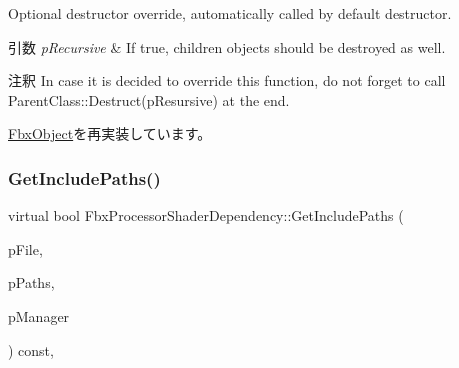 Optional destructor override, automatically called by default destructor. 
\begin{DoxyParams}{引数}
{\em p\+Recursive} & If true, children objects should be destroyed as well. \\
\hline
\end{DoxyParams}
\begin{DoxyRemark}{注釈}
In case it is decided to override this function, do not forget to call Parent\+Class\+::\+Destruct(p\+Resursive) at the end. 
\end{DoxyRemark}


\hyperlink{class_fbx_object_a123e084d9b32b29c28af6384b7c3c608}{Fbx\+Object}を再実装しています。

\mbox{\label{class_fbx_processor_shader_dependency_a41473d93802b3f628bede8dad500d42c}} 
\subsubsection{\texorpdfstring{Get\+Include\+Paths()}{GetIncludePaths()}}
{\footnotesize\ttfamily virtual bool Fbx\+Processor\+Shader\+Dependency\+::\+Get\+Include\+Paths (\begin{DoxyParamCaption}\item[{\hyperlink{class_fbx_string}{Fbx\+String} \&}]{p\+File,  }\item[{\hyperlink{class_fbx_processor_shader_dependency_a52e467804857e767f194d73000b08f39}{File\+Path\+List} \&}]{p\+Paths,  }\item[{\hyperlink{class_fbx_x_ref_manager}{Fbx\+X\+Ref\+Manager} \&}]{p\+Manager }\end{DoxyParamCaption}) const\hspace{0.3cm}{\ttfamily [protected]}, {\ttfamily [virtual]}}

\mbox{\label{class_fbx_processor_shader_dependency_a4e6d8ee3e0abd220aeeba254f848f147}} 
